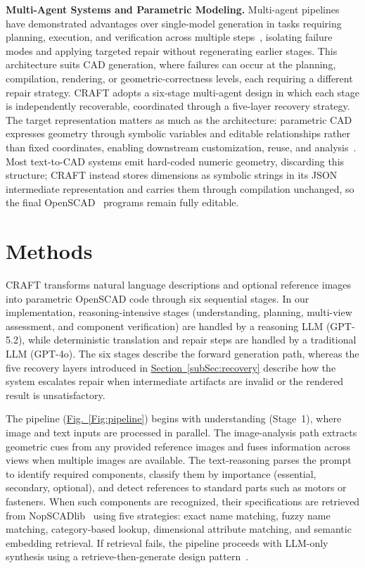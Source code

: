 \documentclass[conference]{IEEEtran}
\newcommand{\colref}[2]{\hyperref[#2]{#1~\ref*{#2}}}
\newcommand{\figref}[1]{\colref{Fig.}{#1}}
\newcommand{\secref}[1]{\colref{Section}{#1}}
\begin{document}
\textbf{Multi-Agent Systems and Parametric Modeling.} Multi-agent pipelines have demonstrated advantages over single-model generation in tasks requiring planning, execution, and verification across multiple steps~\citep{guo2024multiagent}, isolating failure modes and applying targeted repair without regenerating earlier stages. This architecture suits CAD generation, where failures can occur at the planning, compilation, rendering, or geometric-correctness levels, each requiring a different repair strategy. CRAFT adopts a six-stage multi-agent design in which each stage is independently recoverable, coordinated through a five-layer recovery strategy. The target representation matters as much as the architecture: parametric CAD expresses geometry through symbolic variables and editable relationships rather than fixed coordinates, enabling downstream customization, reuse, and analysis~\citep{fusion360gallery2021,wu2021deepcad}. Most text-to-CAD systems emit hard-coded numeric geometry, discarding this structure; CRAFT instead stores dimensions as symbolic strings in its JSON intermediate representation and carries them through compilation unchanged, so the final OpenSCAD~\citep{openscad} programs remain fully editable.


\section{Methods}
\label{Sec:method}

CRAFT transforms natural language descriptions and optional reference images into parametric OpenSCAD code through six sequential stages. In our implementation, reasoning-intensive stages (understanding, planning, multi-view assessment, and component verification) are handled by a reasoning LLM (GPT-5.2), while deterministic translation and repair steps are handled by a traditional LLM (GPT-4o). The six stages describe the forward generation path, whereas the five recovery layers introduced in \secref{subSec:recovery} describe how the system escalates repair when intermediate artifacts are invalid or the rendered result is unsatisfactory.

The pipeline (\figref{Fig:pipeline}) begins with understanding (Stage~1), where image and text inputs are processed in parallel. The image-analysis path extracts geometric cues from any provided reference images and fuses information across views when multiple images are available. The text-reasoning parses the prompt to identify required components, classify them by importance (essential, secondary, optional), and detect references to standard parts such as motors or fasteners. When such components are recognized, their specifications are retrieved from NopSCADlib~\citep{nopscadlib} using five strategies: exact name matching, fuzzy name matching, category-based lookup, dimensional attribute matching, and semantic embedding retrieval. If retrieval fails, the pipeline proceeds with LLM-only synthesis using a retrieve-then-generate design pattern~\citep{lewis2020rag}.
\end{document}
